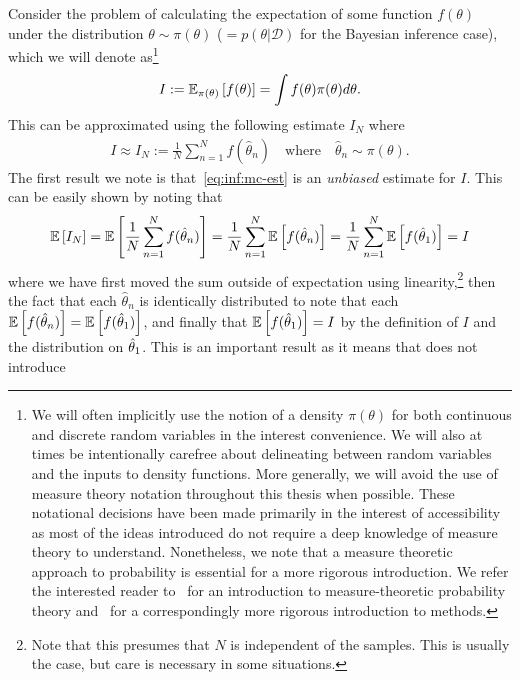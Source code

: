 Consider the problem of calculating the expectation of some function
$f(\theta)$ under the distribution $\theta\sim \pi(\theta)$ ($= p(\theta | \mathcal{D})$ for the Bayesian
inference case), which we will denote 
as\footnote{We will often implicitly use the notion of a density
	$\pi(\theta)$ for both continuous and discrete random variables in the interest
	convenience.  We will also at times be intentionally carefree about delineating between random
	variables and the inputs to density functions.  More generally, we will avoid the use of measure
	theory notation throughout this thesis when possible.  These notational decisions have been made
	primarily in the interest of accessibility as most of the ideas introduced do not require a deep
	knowledge of measure theory to understand.  Nonetheless, we note that a measure theoretic
	approach to probability is essential for a more rigorous introduction.  We refer
	the interested reader to~\cite{durrett2010probability} for an introduction to measure-theoretic
	probability theory and~\cite{robert2004monte} for a correspondingly more rigorous introduction
	to \mc methods.}
\begin{align}
I:=\mathbb{E}_{\pi(\theta)} \left[f(\theta)\right]=\int f(\theta) \pi(\theta) d\theta.
\end{align}
This can be approximated using the following \mc estimate $I_N$ where
\begin{align}
	\label{eq:inf:mc-est}
	I \approx I_N := \frac{1}{N} \sum_{n=1}^{N}f(\hat{\theta}_n)
	\quad \text{where} \quad \hat{\theta}_n \sim \pi(\theta).
\end{align}
The first result we note is that~\eqref{eq:inf:mc-est} is an \emph{unbiased} estimate for $I$.  This can
be easily shown by noting that
\begin{align}
\label{eq:inf:unbiased}
\mathbb{E} \left[I_N\right] = \mathbb{E} \left[\frac{1}{N} \sum_{n=1}^{N}f(\hat{\theta}_n)\right]
= \frac{1}{N} \sum_{n=1}^{N} \mathbb{E} \left[f(\hat{\theta}_n)\right]
= \frac{1}{N} \sum_{n=1}^{N} \mathbb{E} \left[f(\hat{\theta}_1)\right]
= I
\end{align}
where we have first moved the sum outside of expectation using
linearity,\footnote{Note that this presumes that $N$ is independent
	of the samples.  This is usually the case, but care is necessary in some situations.}
then the fact that each $\hat{\theta}_n$ is identically distributed to note that
each $\mathbb{E} \left[f(\hat{\theta}_n)\right]= \mathbb{E} \left[f(\hat{\theta}_1)\right]$, and finally
that $\mathbb{E} \left[f(\hat{\theta}_1)\right] = I$ by the definition of $I$ and the distribution
on $\hat{\theta}_1$.  This is an important result as it means that \mc does not introduce
